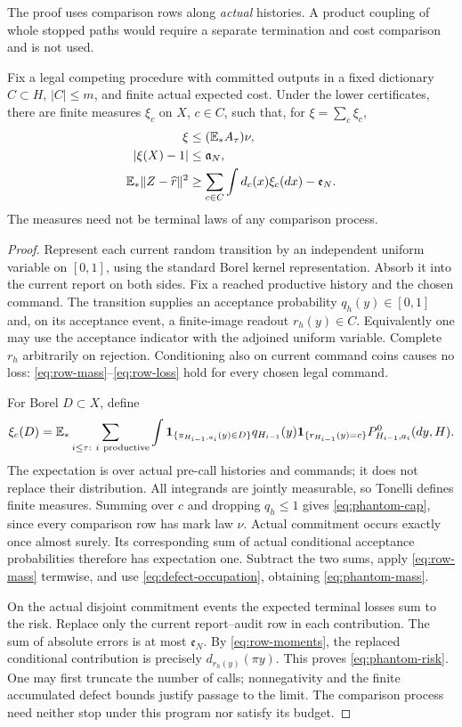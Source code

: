 The proof uses comparison rows along \emph{actual} histories. A product coupling of whole stopped paths would require a separate termination and cost comparison and is not used.

\begin{lemma}\label{lem:comparison-submeasure}
Fix a legal competing procedure with committed outputs in a fixed dictionary $C\subset H$, $|C|\le m$, and finite actual expected cost. Under the lower certificates, there are finite measures $\xi_c$ on $X$, $c\in C$, such that, for $\xi=\sum_c\xi_c$,
\begin{align}
 \xi&\le (\mathbb E_*A_\tau)\nu,\label{eq:phantom-cap}\\
 |\xi(X)-1|&\le\mathfrak a_N,\label{eq:phantom-mass}\\
 \mathbb E_*\|Z-\widehat r\|^2
 &\ge\sum_{c\in C}\int d_c(x)\xi_c(dx)-\mathfrak e_N.
 \label{eq:phantom-risk}
\end{align}
The measures need not be terminal laws of any comparison process.
\end{lemma}
\begin{proof}
Represent each current random transition by an independent uniform variable on $[0,1]$, using the standard Borel kernel representation. Absorb it into the current report on both sides. Fix a reached productive history and the chosen command. The transition supplies an acceptance probability $q_h(y)\in[0,1]$ and, on its acceptance event, a finite-image readout $r_h(y)\in C$. Equivalently one may use the acceptance indicator with the adjoined uniform variable. Complete $r_h$ arbitrarily on rejection. Conditioning also on current command coins causes no loss: \eqref{eq:row-mass}--\eqref{eq:row-loss} hold for every chosen legal command.

For Borel $D\subset X$, define
\[
 \xi_c(D)=\E_*\sum_{i\le\tau:\ i\ {\rm productive}}
  \int\one_{\{\pi_{H_{i-1},a_i}(y)\in D\}}
       q_{H_{i-1}}(y)\one_{\{r_{H_{i-1}}(y)=c\}}
       P^0_{H_{i-1},a_i}(dy,H).
\]
The expectation is over actual pre-call histories and commands; it does not replace their distribution. All integrands are jointly measurable, so Tonelli defines finite measures. Summing over $c$ and dropping $q_h\le1$ gives \eqref{eq:phantom-cap}, since every comparison row has mark law $\nu$. Actual commitment occurs exactly once almost surely. Its corresponding sum of actual conditional acceptance probabilities therefore has expectation one. Subtract the two sums, apply \eqref{eq:row-mass} termwise, and use \eqref{eq:defect-occupation}, obtaining \eqref{eq:phantom-mass}.

On the actual disjoint commitment events the expected terminal losses sum to the risk. Replace only the current report--audit row in each contribution. The sum of absolute errors is at most $\mathfrak e_N$. By \eqref{eq:row-moments}, the replaced conditional contribution is precisely $d_{r_h(y)}(\pi y)$. This proves \eqref{eq:phantom-risk}. One may first truncate the number of calls; nonnegativity and the finite accumulated defect bounds justify passage to the limit. The comparison process need neither stop under this program nor satisfy its budget.
\end{proof}

